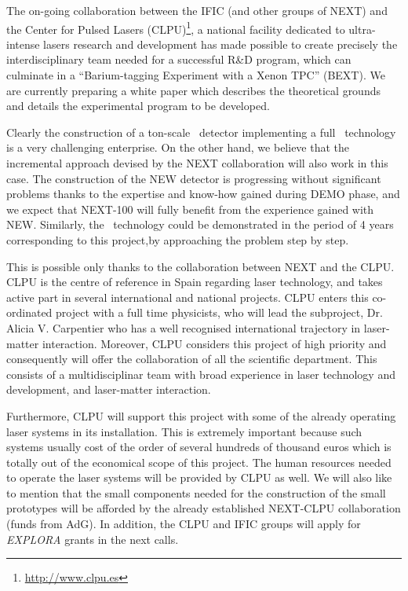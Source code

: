 \documentclass[a4paper,11pt,oneside]{article}
\begin{document}
The on-going collaboration between the IFIC (and other groups of NEXT) and the Center for Pulsed Lasers (CLPU)\footnote{\href{http://www.clpu.es}{http://www.clpu.es}}, a national facility dedicated to ultra-intense lasers research and development has made possible to create precisely the interdisciplinary team needed for a successful R\&D program, which can culminate in a ``Barium-tagging Experiment with a Xenon TPC'' (BEXT). We are currently preparing a white paper which describes the theoretical grounds and details the experimental program to be developed. 

Clearly the construction of a ton-scale \HPXE\ detector implementing a full \BATA\ technology is a very challenging enterprise. On the other hand, we believe that the incremental approach devised by the NEXT collaboration will also work in this case. The construction of the NEW detector is progressing without significant problems thanks to the expertise and know-how gained during DEMO phase, and we expect that NEXT-100 will fully benefit from the experience gained with NEW. Similarly, the \BATA\ technology could be demonstrated in the period of 4 years corresponding to this project,by approaching the problem step by step. 

This is possible only thanks to the collaboration between NEXT and the CLPU.
CLPU is the centre of reference in Spain regarding laser technology, and takes active part in several international and national projects. CLPU enters this co-ordinated project with a full time physicists, who will lead the subproject, Dr. Alicia V. Carpentier who has a well recognised international trajectory in laser-matter interaction. Moreover, CLPU considers this project of high priority and consequently will offer the collaboration of all the scientific department. This consists of a multidisciplinar team with broad experience in laser technology and development, and laser-matter interaction. 

Furthermore, CLPU will support this project with some of the already operating laser systems in its installation. This is extremely important because such systems usually cost of the order of several hundreds of thousand euros which is totally out of the economical scope of this project. The human resources needed to operate the laser systems will be provided by CLPU as well. We will  also like to mention that the small components needed for the construction of the small prototypes will be afforded by the already established NEXT-CLPU collaboration (funds from AdG). In addition, the CLPU and IFIC groups will apply for  \emph{EXPLORA} grants in the next calls.
\end{document}
